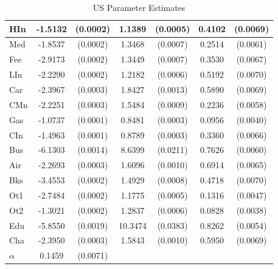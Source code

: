 \documentclass[12pt]{article}
\begin{document}
\begin{table}
\begin{tabular}{|l|c c |c c |c c|}
			\hline
			HIn & -1.5132 &  (0.0002) &  1.1389 & (0.0005) &   0.4102 & (0.0069)\\ 
			\hline
			Med & -1.8537 &  (0.0002) &  1.3468 & (0.0007) &   0.2514 & (0.0061)\\ 
			\hline
			Fee & -2.9173 &  (0.0002) &  1.3449 & (0.0007) &   0.3530 & (0.0067)\\ 
			\hline
			LIn & -2.2290 &  (0.0002) &  1.2182 & (0.0006) &   0.5192 & (0.0070)\\ 
			\hline
			Car & -2.3967 &  (0.0003) &  1.8427 & (0.0013) &   0.5890 & (0.0069)\\ 
			\hline
			CMn & -2.2251 &  (0.0003) &  1.5484 & (0.0009) &   0.2236 & (0.0058)\\ 
			\hline
			Gas & -1.0737 &  (0.0001) &  0.8481 & (0.0003) &   0.0956 & (0.0040)\\ 
			\hline
			CIn & -1.4963 &  (0.0001) &  0.8789 & (0.0003) &   0.3360 & (0.0066)\\ 
			\hline
			Bus & -6.1303 &  (0.0014) &  8.6399 & (0.0211) &   0.7626 & (0.0060)\\ 
			\hline
			Air & -2.2693 &  (0.0003) &  1.6096 & (0.0010) &   0.6914 & (0.0065)\\ 
			\hline
			Bks & -3.4553 &  (0.0002) &  1.4929 & (0.0008) &   0.4718 & (0.0070)\\ 
			\hline
			Ot1 & -2.7484 &  (0.0002) &  1.1775 & (0.0005) &   0.1316 & (0.0047)\\ 
			\hline
			Ot2 & -1.3021 &  (0.0002) &  1.2837 & (0.0006) &   0.0828 & (0.0038)\\ 
			\hline
			Edu & -5.8550 &  (0.0019) & 10.3474 & (0.0383) &   0.8262 & (0.0054)\\ 
			\hline
			Cha & -2.3950 &  (0.0003) &  1.5843 & (0.0010) &   0.5950 & (0.0069)\\ 
			\hline
		        \hline	
			$\alpha$ & 0.1459 & (0.0071) & & & & \\
			\hline
			\hline
		\end{tabular}
	\caption{US Parameter Estimates}
	\label{tab:parest}
\end{table}
\end{document}

